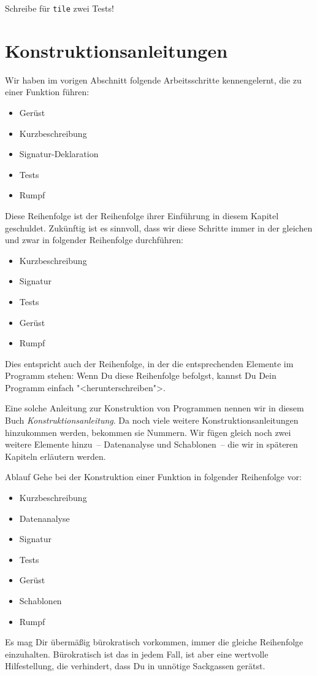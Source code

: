 \begin{aufgabe}
  Schreibe für \texttt{tile} zwei Tests!
\end{aufgabe}

\section{Konstruktionsanleitungen}
\label{sec:konstruktionsanleitungen}
%
Wir haben im vorigen Abschnitt folgende Arbeitsschritte kennengelernt,
die zu einer Funktion führen:
%
\begin{itemize}
\item Gerüst
\item Kurzbeschreibung
\item Signatur-Deklaration
\item Tests
\item Rumpf
\end{itemize}
%
Diese Reihenfolge ist der Reihenfolge ihrer Einführung in diesem
Kapitel geschuldet.  Zukünftig ist es sinnvoll, dass wir diese Schritte
immer in der gleichen und zwar in folgender Reihenfolge durchführen:
%
\begin{itemize}
\item Kurzbeschreibung
\item Signatur
\item Tests
\item Gerüst
\item Rumpf
\end{itemize}
%
Dies entspricht auch der Reihenfolge, in der die entsprechenden
Elemente im Programm stehen: Wenn Du diese Reihenfolge befolgst,
kannst Du Dein Programm einfach "<herunterschreiben">.

Eine solche Anleitung zur Konstruktion von Programmen nennen wir in
diesem Buch
\textit{Konstruktionsanleitung}.  Da
noch viele weitere Konstruktionsanleitungen hinzukommen werden,
bekommen sie Nummern.  Wir fügen gleich noch zwei weitere Elemente
hinzu~-- Datenanalyse und Schablonen~-- die wir in späteren Kapiteln
erläutern werden.

\begin{konstruktionsanleitung}{Ablauf}
  Gehe bei der Konstruktion einer Funktion in folgender Reihenfolge
  vor:
  \begin{itemize}
    \item Kurzbeschreibung
    \item Datenanalyse
    \item Signatur
    \item Tests
    \item Gerüst
    \item Schablonen
    \item Rumpf
    \end{itemize}
\end{konstruktionsanleitung}
%
Es mag Dir übermäßig bürokratisch vorkommen, immer die gleiche
Reihenfolge einzuhalten.  Bürokratisch ist das in jedem Fall, ist aber
eine wertvolle Hilfestellung, die verhindert, dass Du in unnötige
Sackgassen gerätst.

